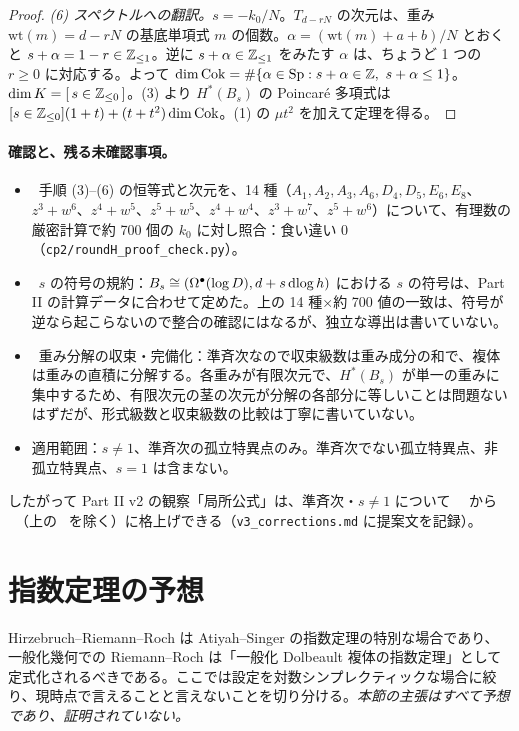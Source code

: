 \begin{proof}
\emph{(6) スペクトルへの翻訳。}$s=-k_0/N$。$T_{d-rN}$ の次元は、重み $\mathrm{wt}(m)=d-rN$ の基底単項式 $m$ の個数。$\alpha=(\mathrm{wt}(m)+a+b)/N$ とおくと $s+\alpha=1-r\in\mathbb Z_{\le1}$。逆に $s+\alpha\in\mathbb Z_{\le1}$ をみたす $\alpha$ は、ちょうど 1 つの $r\ge0$ に対応する。よって $\dim\mathrm{Cok}=\#\{\alpha\in\mathrm{Sp}:s+\alpha\in\Z,\ s+\alpha\le1\}$。$\dim K=[\,s\in\mathbb Z_{\le0}\,]$。(3) より $H^*(B_s)$ の Poincar\'e 多項式は $[s\in\mathbb Z_{\le0}](1+t)+(t+t^2)\dim\mathrm{Cok}$。(1) の $\mu t^2$ を加えて定理を得る。
\end{proof}
\paragraph{確認と、残る未確認事項。}
\begin{itemize}
\item \tV\ 手順 (3)--(6) の恒等式と次元を、14 種（$A_1,A_2,A_3,A_6,D_4,D_5,E_6,E_8$、$z^3+w^6$、$z^4+w^5$、$z^5+w^5$、$z^4+w^4$、$z^3+w^7$、$z^5+w^6$）について、有理数の厳密計算で約 700 個の $k_0$ に対し照合：食い違い 0（\texttt{cp2/roundH\_proof\_check.py}）。
\item \tQ\ $s$ の符号の規約：$B_s\cong(\Omega^\bullet(\log D),d+s\,\mathrm{dlog}\, h)$ における $s$ の符号は、Part II の計算データに合わせて定めた。上の 14 種×約 700 値の一致は、符号が逆なら起こらないので整合の確認にはなるが、独立な導出は書いていない。
\item \tQ\ 重み分解の収束・完備化：準斉次なので収束級数は重み成分の和で、複体は重みの直積に分解する。各重みが有限次元で、$H^*(B_s)$ が単一の重みに集中するため、有限次元の茎の次元が分解の各部分に等しいことは問題ないはずだが、形式級数と収束級数の比較は丁寧に書いていない。
\item 適用範囲：$s\ne1$、準斉次の孤立特異点のみ。準斉次でない孤立特異点、非孤立特異点、$s=1$ は含まない。
\end{itemize}
したがって Part II v2 の観察「局所公式」は、準斉次・$s\ne1$ について \tV\ \tK\ から \tP\ （上の \tQ\ を除く）に格上げできる（\texttt{v3\_corrections.md} に提案文を記録）。

\section{指数定理の予想}\label{p5:sec:index}
Hirzebruch--Riemann--Roch は Atiyah--Singer の指数定理の特別な場合であり、一般化幾何での Riemann--Roch は「一般化 Dolbeault 複体の指数定理」として定式化されるべきである。ここでは設定を対数シンプレクティックな場合に絞り、現時点で言えることと言えないことを切り分ける。\emph{本節の主張はすべて予想であり、証明されていない。}

